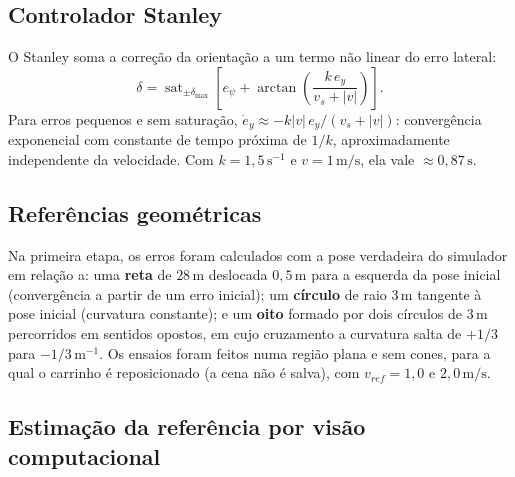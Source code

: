 \subsection{Controlador Stanley}

O Stanley \cite{thrun2006stanley,hoffmann2007stanley,snider2009steering} soma a correção da orientação a um termo não linear do erro lateral:
\begin{equation}
\delta = \operatorname{sat}_{\pm\delta_{\max}}\left[e_\psi + \arctan\left(\frac{k\,e_y}{v_s+|v|}\right)\right].
\label{eq:stanley}
\end{equation}
Para erros pequenos e sem saturação, $\dot e_y \approx -k|v|\,e_y/(v_s+|v|)$: convergência exponencial com constante de tempo próxima de $1/k$, aproximadamente independente da velocidade. Com $k=1{,}5\,\mathrm{s^{-1}}$ e $v=1\,\mathrm{m/s}$, ela vale $\approx0{,}87\,\mathrm{s}$.

\subsection{Referências geométricas}

Na primeira etapa, os erros foram calculados com a pose verdadeira do simulador em relação a: uma \textbf{reta} de $28\,\mathrm{m}$ deslocada $0{,}5\,\mathrm{m}$ para a esquerda da pose inicial (convergência a partir de um erro inicial); um \textbf{círculo} de raio $3\,\mathrm{m}$ tangente à pose inicial (curvatura constante); e um \textbf{oito} formado por dois círculos de $3\,\mathrm{m}$ percorridos em sentidos opostos, em cujo cruzamento a curvatura salta de $+1/3$ para $-1/3\,\mathrm{m^{-1}}$. Os ensaios foram feitos numa região plana e sem cones, para a qual o carrinho é reposicionado (a cena não é salva), com $v_{ref}=1{,}0$ e $2{,}0\,\mathrm{m/s}$.

\subsection{Estimação da referência por visão computacional}\label{sec:visao}

